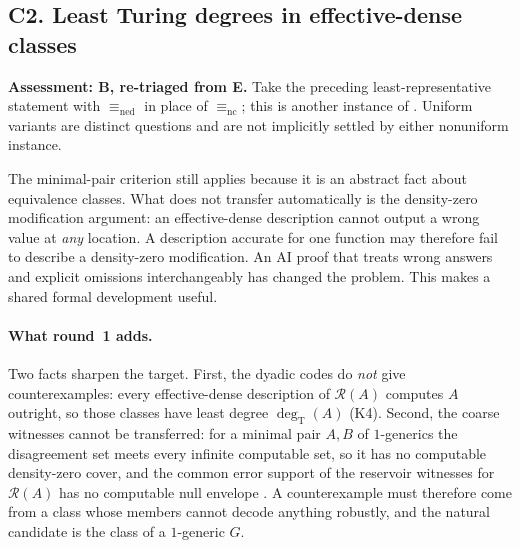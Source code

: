 \documentclass[11pt,a4paper]{article}
\newcommand{\R}{\mathcal R}
\newcommand{\degT}{\operatorname{deg}_{\mathrm T}}
\newcommand{\W}{\textbf{B}}\newcommand{\E}{\textbf{E}}\newcommand{\Lr}{\textbf{H}}
\newcommand{\problemheading}[3]{\subsection{#1. #2}\label{entry:#1}\noindent\textbf{Assessment: #3.}\enspace}
\theoremstyle{definition}\newtheorem{definition}[theorem]{Definition}
\theoremstyle{remark}\newtheorem{remark}[theorem]{Remark}
\begin{document}
\problemheading{C2}{Least Turing degrees in effective-dense classes}{\W{}, re-triaged from \E{}}
Take the preceding least-representative statement with $\equiv_{\mathrm{ned}}$ in place of $\equiv_{\mathrm{nc}}$; this is another instance of \cite[Question~7]{Gerdes}. Uniform variants are distinct questions and are not implicitly settled by either nonuniform instance.

The minimal-pair criterion still applies because it is an abstract fact about equivalence classes. What does not transfer automatically is the density-zero modification argument: an effective-dense description cannot output a wrong value at \emph{any} location. A description accurate for one function may therefore fail to describe a density-zero modification. An AI proof that treats wrong answers and explicit omissions interchangeably has changed the problem. This makes a shared formal development useful.

\paragraph{What round~1 adds.} Two facts sharpen the target. First, the dyadic codes do \emph{not} give counterexamples: every effective-dense description of $\R(A)$ computes $A$ outright, so those classes have least degree $\degT(A)$ (K4). Second, the coarse witnesses cannot be transferred: for a minimal pair $A,B$ of $1$-generics the disagreement set meets every infinite computable set, so it has no computable density-zero cover, and the common error support of the reservoir witnesses for $\R(A)$ has no computable null envelope \cite[Propositions 5.8 and 7.5]{Synthesis}. A counterexample must therefore come from a class whose members cannot decode anything robustly, and the natural candidate is the class of a $1$-generic $G$.
\end{document}
